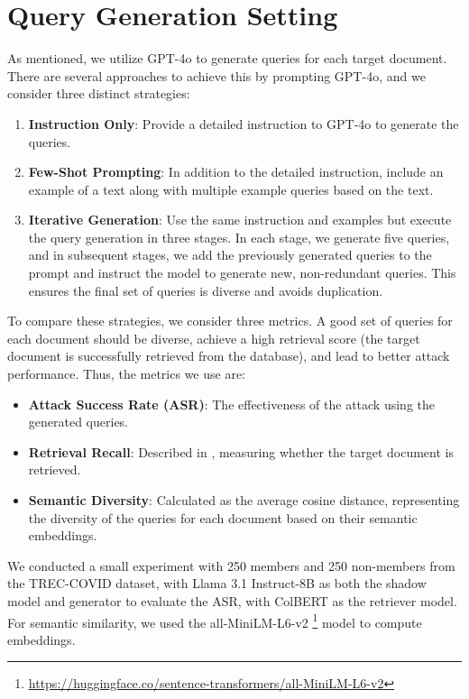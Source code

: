 \section{Query Generation Setting}
\label{app:query_generation_setting}



As mentioned, we utilize GPT-4o to generate queries for each target document. There are several approaches to achieve this by prompting GPT-4o, and we consider three distinct strategies:

\begin{enumerate}
    \item \textbf{Instruction Only}: Provide a detailed instruction to GPT-4o to generate the queries.
    \item \textbf{Few-Shot Prompting}: In addition to the detailed instruction, include an example of a text along with multiple example queries based on the text.
    \item \textbf{Iterative Generation}: Use the same instruction and examples but execute the query generation in three stages. In each stage, we generate five queries, and in subsequent stages, we add the previously generated queries to the prompt and instruct the model to generate new, non-redundant queries. This ensures the final set of queries is diverse and avoids duplication.
\end{enumerate}
To compare these strategies, we consider three metrics. A good set of queries for each document should be diverse, achieve a high retrieval score (\ie the target document is successfully retrieved from the database), and lead to better attack performance. Thus, the metrics we use are: 

\begin{itemize}
    \item \textbf{Attack Success Rate (ASR)}: The effectiveness of the attack using the generated queries.
    \item \textbf{Retrieval Recall}: Described in , measuring whether the target document is retrieved.
    \item \textbf{Semantic Diversity}: Calculated as the average cosine distance, representing the diversity of the queries for each document based on their semantic embeddings.
\end{itemize}
We conducted a small experiment with 250 members and 250 non-members from the TREC-COVID dataset, with Llama 3.1 Instruct-8B as both the shadow model and generator to evaluate the ASR, with ColBERT as the retriever model. For semantic similarity, we used the all-MiniLM-L6-v2 \footnote{\url{https://huggingface.co/sentence-transformers/all-MiniLM-L6-v2}} model to compute embeddings.

